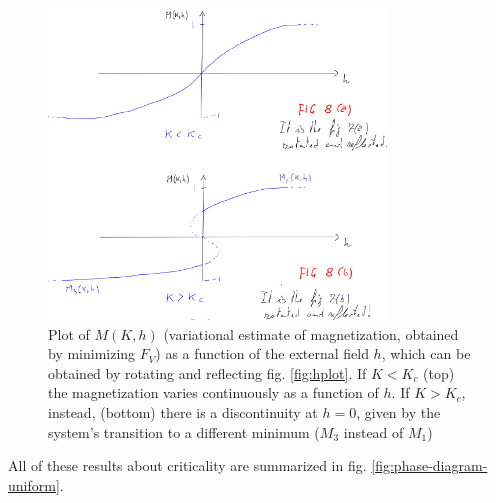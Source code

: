 \documentclass[../../main.tex]{subfiles}
\begin{document}
\begin{figure}[H]
    \centering
    \includegraphics[width=0.8\textwidth]{Mhplot.png}
    \caption{
    Plot of $M(K,h)$ (variational estimate of magnetization, obtained by minimizing $F_V$) as a function of the external field $h$, which can be obtained by rotating and reflecting fig. \ref{fig:hplot}.    
    If $K < K_c$ (top) the magnetization varies continuously as a function of $h$. If $K > K_c$, instead, (bottom) there is a discontinuity at $h=0$, given by the system's transition to a different minimum ($M_3$ instead of $M_1$)}
    \label{fig:Mhplot}
\end{figure}

All of these results about criticality are summarized in fig. \ref{fig:phase-diagram-uniform}.
\end{document}
